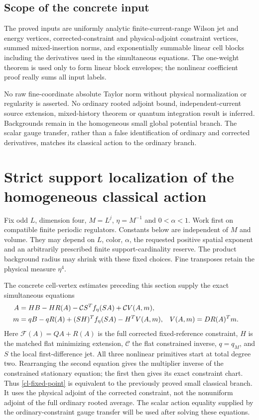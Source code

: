 \documentclass[11pt]{article}
\theoremstyle{remark}
\begin{document}
\subsection{Scope of the concrete input}
\label{cv-scope}

The proved inputs are uniformly analytic finite-current-range
Wilson jet and energy vertices, corrected-constraint and
physical-adjoint constraint vertices, summed mixed-insertion
norms, and exponentially summable linear cell blocks including
the derivatives used in the simultaneous equations. The
one-weight theorem is used only to form linear block
envelopes; the nonlinear coefficient proof really sums all
input labels.

No raw fine-coordinate absolute Taylor norm without physical
normalization or regularity is asserted. No ordinary rooted
adjoint bound, independent-current source extension,
mixed-history theorem or quantum integration result is
inferred. Backgrounds remain in the homogeneous small global
potential branch. The scalar gauge transfer, rather than a
false identification of ordinary and corrected derivatives,
matches its classical action to the ordinary branch.

\section{Strict support localization of the homogeneous classical action}
\label{cl-section}

Fix odd $L$, dimension four, $M=L^j$, $\eta=M^{-1}$ and
$0<\alpha<1$. Work first on compatible finite periodic regulators.
Constants below are independent of $M$ and volume. They may depend on
$L$, color, $\alpha$, the requested positive spatial exponent and an
arbitrarily prescribed finite support-cardinality reserve. The product
background radius may shrink with these fixed choices. Fine transposes
retain the physical measure $\eta^4$.

The concrete cell-vertex estimates preceding this section supply the
exact simultaneous equations
\begin{align}
 A&=HB-HR(A)-\mathcal C S^T f_\eta(SA)
                         +\mathcal C V(A,m),\notag\\
 m&=qB-qR(A)+(SH)^T f_\eta(SA)-H^T V(A,m),
 &V(A,m)&=DR(A)^Tm.                                      \label{cl-fixed-point}
\end{align}
Here $\mathcal F(A)=QA+R(A)$ is the full corrected fixed-reference
constraint, $H$ is the matched flat minimizing extension,
$\mathcal C$ the flat constrained inverse, $q=q_M$, and $S$ the local
first-difference jet. All three nonlinear primitives start at total
degree two. Rearranging the second equation gives the multiplier inverse
of the constrained stationary equation; the first then gives its exact
constraint chart. Thus \eqref{cl-fixed-point} is equivalent to the
previously proved small classical branch. It uses the physical adjoint
of the corrected constraint, not the nonuniform adjoint of the full
ordinary rooted average. The scalar action equality supplied by the
ordinary-constraint gauge transfer will be used after solving these
equations.
\end{document}
